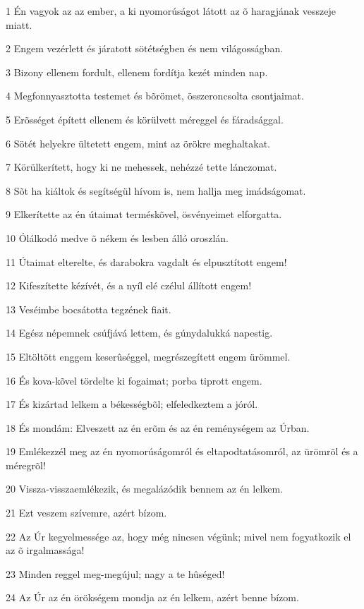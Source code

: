 \par 1 Én vagyok az az ember, a ki nyomorúságot látott az õ haragjának vesszeje miatt.
\par 2 Engem vezérlett és járatott sötétségben és nem világosságban.
\par 3 Bizony ellenem fordult, ellenem fordítja kezét minden nap.
\par 4 Megfonnyasztotta testemet és bõrömet, összeroncsolta csontjaimat.
\par 5 Erõsséget épített ellenem és körülvett méreggel és fáradsággal.
\par 6 Sötét helyekre ültetett engem, mint az örökre meghaltakat.
\par 7 Körülkerített, hogy ki ne mehessek, nehézzé tette lánczomat.
\par 8 Sõt ha kiáltok és segítségül hívom is, nem hallja meg imádságomat.
\par 9 Elkerítette az én útaimat terméskõvel, ösvényeimet elforgatta.
\par 10 Ólálkodó medve õ nékem és lesben álló oroszlán.
\par 11 Útaimat elterelte, és darabokra vagdalt és elpusztított engem!
\par 12 Kifeszítette kézívét, és a nyíl elé czélul állított engem!
\par 13 Veséimbe bocsátotta tegzének fiait.
\par 14 Egész népemnek csúfjává lettem, és gúnydalukká napestig.
\par 15 Eltöltött enggem keserûséggel, megrészegített engem ürömmel.
\par 16 És kova-kõvel tördelte ki fogaimat; porba tiprott engem.
\par 17 És kizártad lelkem a békességbõl; elfeledkeztem a jóról.
\par 18 És mondám: Elveszett az én erõm és az én reménységem az Úrban.
\par 19 Emlékezzél meg az én nyomorúságomról és eltapodtatásomról, az ürömrõl és a méregrõl!
\par 20 Vissza-visszaemlékezik, és megalázódik bennem az én lelkem.
\par 21 Ezt veszem szívemre, azért bízom.
\par 22 Az Úr kegyelmessége az, hogy még nincsen végünk; mivel nem fogyatkozik el az õ irgalmassága!
\par 23 Minden reggel meg-megújul; nagy a te hûséged!
\par 24 Az Úr az én örökségem mondja az én lelkem, azért benne bízom.
